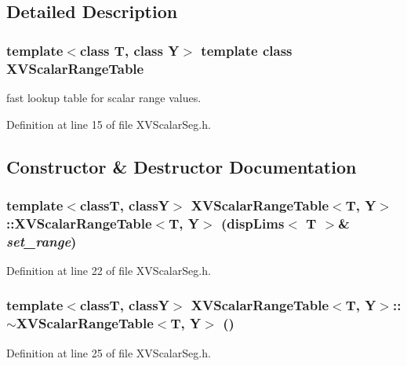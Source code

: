 \subsection{Detailed Description}
\subsubsection*{template$<$class T, class Y$>$  template class XVScalar\-Range\-Table}

fast lookup table for scalar range values.





Definition at line 15 of file XVScalar\-Seg.h.

\subsection{Constructor \& Destructor Documentation}
\label{XVScalarRangeTable_a0}
\hypertarget{class_XVScalarRangeTable_a0}{
\subsubsection[XVScalarRangeTable]{\setlength{\rightskip}{0pt plus 5cm}template$<$classT, classY$>$ XVScalar\-Range\-Table$<$T, Y$>$::XVScalar\-Range\-Table$<$T, Y$>$ (disp\-Lims$<$ T $>$\& {\em set\_\-range})}}




Definition at line 22 of file XVScalar\-Seg.h.\label{XVScalarRangeTable_a1}
\hypertarget{class_XVScalarRangeTable_a1}{
\subsubsection[~XVScalarRangeTable]{\setlength{\rightskip}{0pt plus 5cm}template$<$classT, classY$>$ XVScalar\-Range\-Table$<$T, Y$>$::$\sim$XVScalar\-Range\-Table$<$T, Y$>$ ()}}




Definition at line 25 of file XVScalar\-Seg.h.

